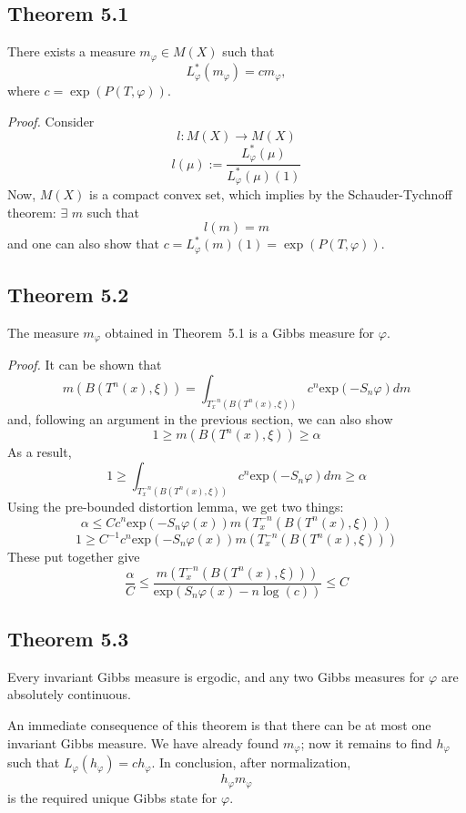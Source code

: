 \documentclass[11pt,a4paper]{article}
\begin{document}
\subsection*{Theorem 5.1}
    There exists a measure $m_{\varphi} \in M(X)$ such that
    $$L_{\varphi}^*(m_{\varphi}) = c m_{\varphi},$$
    where $c = \exp(P(T, \varphi))$.

\textit{Proof.}
    Consider
    $$l: M(X) \rightarrow M(X)$$
    $$l(\mu):= \frac{L_{\varphi}^*(\mu)}{L_{\varphi}^*(\mu)(1)}$$
    Now, $M(X)$ is a compact convex set, which implies by the Schauder-Tychnoff theorem: $\exists$ $m$ such that
    $$l(m) = m$$
    and one can also show that $c = L_{\varphi}^*(m)(1) = \exp(P(T, \varphi))$.

\subsection*{Theorem 5.2}
    The measure $m_{\varphi}$ obtained in Theorem~5.1 is a Gibbs measure for $\varphi$.

\textit{Proof.}
    It can be shown that
    $$m(B(T^n(x), \xi)) = \int_{T_x^{-n}(B(T^n(x), \xi))}c^n\text{exp}(-S_n\varphi)dm$$
    and, following an argument in the previous section, we can also show
    $$1 \geq m(B(T^n(x), \xi)) \geq \alpha$$
    As a result,
    $$1 \geq \int_{T_x^{-n}(B(T^n(x), \xi))}c^n\text{exp}(-S_n\varphi)dm \geq \alpha$$
    Using the pre-bounded distortion lemma, we get two things:
    $$\alpha \leq Cc^n \text{exp}(-S_n\varphi(x))m(T_x^{-n}(B(T^n(x), \xi)))$$
    $$1 \geq C^{-1}c^n\text{exp}(-S_n\varphi(x))m(T_x^{-n}(B(T^n(x), \xi)))$$
    These put together give
    $$\frac{\alpha}{C} \leq \frac{m(T_x^{-n}(B(T^n(x), \xi)))}{\text{exp}(S_n\varphi(x) - n\log(c))} \leq C$$

\subsection*{Theorem 5.3}
    Every invariant Gibbs measure is ergodic, and any two Gibbs measures for $\varphi$ are absolutely continuous.

An immediate consequence of this theorem is that there can be at most one
invariant Gibbs measure. We have already found $m_{\varphi}$; now it remains
to find $h_{\varphi}$ such that $L_{\varphi}(h_{\varphi})=c h_{\varphi}$.
In conclusion, after normalization,
$$h_{\varphi}m_{\varphi}$$
is the required unique Gibbs state for $\varphi$.
\end{document}
